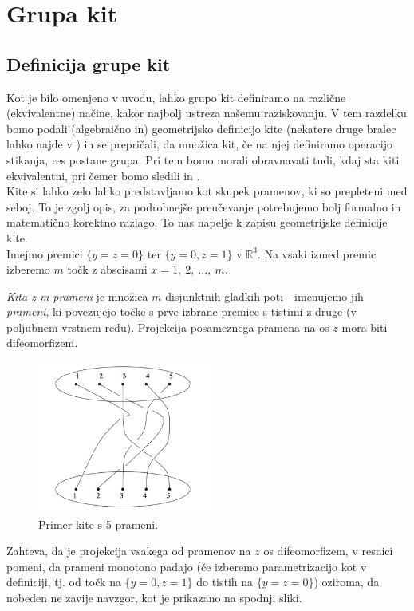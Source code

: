 \documentclass[mat1]{fmfdelo}
\newcommand{\R}{\mathbb R}
\begin{document}
\section{Grupa kit}

\subsection{Definicija grupe kit}

Kot je bilo omenjeno v uvodu, lahko grupo kit definiramo na različne (ekvivalentne) načine, kakor najbolj ustreza našemu raziskovanju. V tem razdelku bomo podali (algebraično in) geometrijsko definicijo kite (nekatere druge bralec lahko najde v \cite{Manturov}) in se prepričali, da množica kit, če na njej definiramo operacijo stikanja, res postane grupa. Pri tem bomo morali obravnavati tudi, kdaj sta kiti ekvivalentni, pri čemer bomo sledili \cite{Burde} in \cite{Manturov}.\\
Kite si lahko zelo lahko predstavljamo kot skupek pramenov, ki so prepleteni med seboj. To je zgolj opis, za podrobnejše preučevanje potrebujemo bolj formalno in matematično korektno razlago. To nas napelje k zapisu geometrijske definicije kite.\\
Imejmo premici $\{y = z = 0\}$ ter $\{y = 0, z = 1\}$ v $\R^3$. Na vsaki izmed premic izberemo $m$ točk z abscisami $x=1,\ 2,\ \ldots,\ m$.

\begin{definicija}
\emph{Kita z m prameni} je množica $m$ disjunktnih gladkih poti - imenujemo jih \emph{prameni}, ki povezujejo točke s prve izbrane premice s tistimi z druge (v poljubnem vrstnem redu). Projekcija posameznega pramena na os $z$ mora biti difeomorfizem.
\end{definicija}

\begin{figure}[h!]
\includegraphics[height = 5cm]{Primer_kite_1}
\caption{Primer kite s 5 prameni.}
\end{figure}

\begin{opomba}
Zahteva, da je projekcija vsakega od pramenov na $z$ os difeomorfizem, v resnici pomeni, da prameni monotono padajo (če izberemo parametrizacijo kot v definiciji, tj. od točk na $\{y = 0, z = 1\}$ do tistih na $\{y = z = 0\}$) oziroma, da nobeden ne zavije navzgor, kot je prikazano na spodnji sliki.
\end{opomba}
\end{document}
